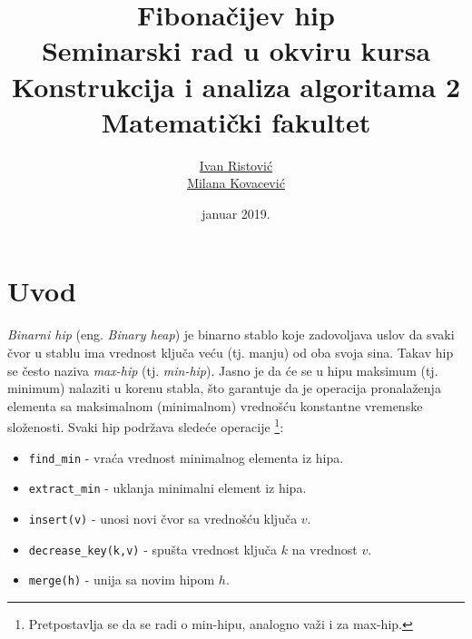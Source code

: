 \documentclass[a4paper]{article}
\theoremstyle{plain}
\theoremstyle{definition}
\begin{document}
\title{Fibona\v{c}ijev hip\\ \small{Seminarski rad u okviru kursa\\Konstrukcija i analiza algoritama 2\\ Matematički fakultet}}

\author{\href{mailto:ivan_ristovic@math.rs}{Ivan Ristovi\'c}\\\href{mailto:mi14042@matf.bg.ac.rs}{Milana Kovacevi\'c{}}}
\date{januar 2019.}

\maketitle


\tableofcontents

\newpage

\section{Uvod}
\label{sec:Uvod}

\emph{Binarni hip} (eng. \emph{Binary heap}) \cite{Heap} je binarno stablo koje zadovoljava uslov da svaki \v{c}vor u stablu ima vrednost klju\v{c}a ve\'c{}u (tj. manju) od oba svoja sina. Takav hip se \v{c}esto naziva \emph{max-hip} (tj. \emph{min-hip}). Jasno je da \'c{}e se u hipu maksimum (tj. minimum) nalaziti u korenu stabla, \v{s}to garantuje da je operacija pronala\v{z}enja elementa sa maksimalnom (minimalnom) vredno\v{s}\'{c}u konstantne vremenske slo\v{z}enosti. Svaki hip podr\v{z}ava slede\'c{}e operacije \footnote{Pretpostavlja se da se radi o min-hipu, analogno va\v{z}i i za max-hip.}:
\begin{itemize}
    \item \texttt{find\_min} - vra\'c{}a vrednost minimalnog elementa iz hipa.
    \item \texttt{extract\_min} - uklanja minimalni element iz hipa.
    \item \texttt{insert(v)} - unosi novi \v{c}vor sa vredno\v{s}\'c{}u klju\v{c}a $v$.
    \item \texttt{decrease\_key(k,v)} - spu\v{s}ta vrednost klju\v{c}a $k$ na vrednost $v$.
    \item \texttt{merge(h)} - unija sa novim hipom $h$.
\end{itemize}
\end{document}
